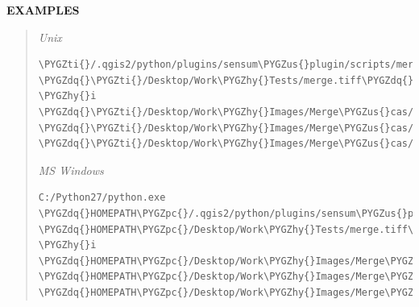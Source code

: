 \documentclass[letterpaper,10pt,english]{sphinxmanual}
\def\PYGZus{\char`\_}
\def\PYGZpc{\char`\%}
\def\PYGZhy{\char`\-}
\def\PYGZdq{\char`\"}
\def\PYGZti{\char`\~}
\begin{document}
\textbf{EXAMPLES}
\begin{quote}

\emph{Unix}

\begin{Verbatim}[frame=single,commandchars=\\\{\}]
\PYGZti{}/.qgis2/python/plugins/sensum\PYGZus{}plugin/scripts/merge.py \PYGZdq{}\PYGZti{}/Desktop/Work\PYGZhy{}Tests/merge.tiff\PYGZdq{} \PYGZhy{}i \PYGZdq{}\PYGZti{}/Desktop/Work\PYGZhy{}Images/Merge\PYGZus{}cas/merge\PYGZus{}01.tiff\PYGZdq{} \PYGZdq{}\PYGZti{}/Desktop/Work\PYGZhy{}Images/Merge\PYGZus{}cas/merge\PYGZus{}02.tiff\PYGZdq{} \PYGZdq{}\PYGZti{}/Desktop/Work\PYGZhy{}Images/Merge\PYGZus{}cas/merge\PYGZus{}03.tiff\PYGZdq{}
\end{Verbatim}

\emph{MS Windows}

\begin{Verbatim}[frame=single,commandchars=\\\{\}]
C:/Python27/python.exe \PYGZdq{}HOMEPATH\PYGZpc{}/.qgis2/python/plugins/sensum\PYGZus{}plugin/scripts/merge.py\PYGZdq{} \PYGZdq{}HOMEPATH\PYGZpc{}/Desktop/Work\PYGZhy{}Tests/merge.tiff\PYGZdq{} \PYGZhy{}i \PYGZdq{}HOMEPATH\PYGZpc{}/Desktop/Work\PYGZhy{}Images/Merge\PYGZus{}cas/merge\PYGZus{}01.tiff\PYGZdq{} \PYGZdq{}HOMEPATH\PYGZpc{}/Desktop/Work\PYGZhy{}Images/Merge\PYGZus{}cas/merge\PYGZus{}02.tiff\PYGZdq{} \PYGZdq{}HOMEPATH\PYGZpc{}/Desktop/Work\PYGZhy{}Images/Merge\PYGZus{}cas/merge\PYGZus{}03.tiff\PYGZdq{}
\end{Verbatim}
\end{quote}
\end{document}
